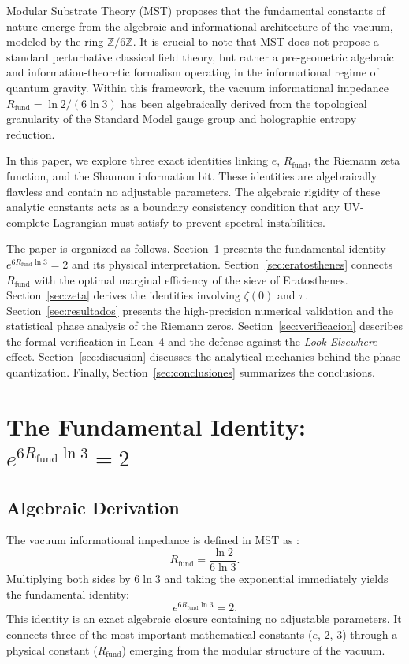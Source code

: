 \documentclass[10pt,a4paper]{article}
\newcommand{\Rfund}{R_{\text{fund}}}
\begin{document}
Modular Substrate Theory (MST) \cite{PeinadorGenesis, PeinadorAlpha, PeinadorDSP} proposes that the fundamental constants of nature emerge from the algebraic and informational architecture of the vacuum, modeled by the ring \(\mathbb{Z}/6\mathbb{Z}\).
It is crucial to note that MST does not propose a standard perturbative classical field theory, but rather a pre-geometric algebraic and information-theoretic formalism operating in the informational regime of quantum gravity.
Within this framework, the vacuum informational impedance \(\Rfund = \ln 2/(6\ln 3)\) has been algebraically derived \cite{PeinadorGenesis} from the topological granularity of the Standard Model gauge group and holographic entropy reduction.

In this paper, we explore three exact identities linking \(e\), \(\Rfund\), the Riemann zeta function, and the Shannon information bit.
These identities are algebraically flawless and contain no adjustable parameters.
The algebraic rigidity of these analytic constants acts as a boundary consistency condition that any UV-complete Lagrangian must satisfy to prevent spectral instabilities.

The paper is organized as follows. Section~\ref{sec:identidad} presents the fundamental identity \(e^{6\Rfund\ln 3} = 2\) and its physical interpretation.
Section~\ref{sec:eratosthenes} connects \(\Rfund\) with the optimal marginal efficiency of the sieve of Eratosthenes.
Section~\ref{sec:zeta} derives the identities involving \(\zeta(0)\) and \(\pi\). Section~\ref{sec:resultados} presents the high-precision numerical validation and the statistical phase analysis of the Riemann zeros.
Section~\ref{sec:verificacion} describes the formal verification in Lean~4 and the defense against the \textit{Look-Elsewhere} effect.
Section~\ref{sec:discusion} discusses the analytical mechanics behind the phase quantization. Finally, Section~\ref{sec:conclusiones} summarizes the conclusions.

\section[The Fundamental Identity]{The Fundamental Identity: \(e^{6\Rfund\ln 3} = 2\)}
\label{sec:identidad}

\subsection{Algebraic Derivation}

The vacuum informational impedance is defined in MST as \cite{PeinadorGenesis}:
\begin{equation}
\Rfund = \frac{\ln 2}{6\ln 3}.
\label{eq:rfund}
\end{equation}
Multiplying both sides by \(6\ln 3\) and taking the exponential immediately yields the fundamental identity:
\begin{equation}
\boxed{e^{6\Rfund\ln 3} = 2}.
\label{eq:identidad}
\end{equation}
This identity is an exact algebraic closure containing no adjustable parameters.
It connects three of the most important mathematical constants (\(e\), \(2\), \(3\)) through a physical constant (\(\Rfund\)) emerging from the modular structure of the vacuum.
\end{document}
